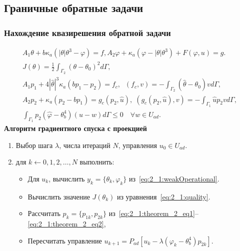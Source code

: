 \subsection{Граничные обратные задачи}
\begin{frame}
    \frametitle{Нахождение квазирешения обратной задачи}
    \begin{gather}
        A_1 \theta + b \kappa_a (| \theta | \theta^3 - \varphi ) =
        f, A_2 \varphi + \kappa_a (\varphi - |\theta|\theta^3) + F(\varphi, u) = g.
        \label{eq:2_1:weakOperational}\\
        J(\theta) = \frac{1}{2} \int_{\Gamma_2} (\theta - \theta_0)^2 d\Gamma,
        \label{eq:2_1:quality}\\
        A_1 p_1 + 4 |\hat{\theta}|^3 \kappa_a(b p_1 - p_2) = f_c,
        \;\; (f_c,v) = - \int_{\Gamma_2} (\hat{\theta} - \theta_0) v d\Gamma,
        \label{eq:2_1:theorem_2_eq1}\\
        A_2 p_2 + \kappa_a (p_2-b p_1) = g_c(p_2, \hat{u}),
        \;(g_c(p_2, \hat{u}), v) = -\int_{\Gamma_1} \hat{u} p_2 v d\Gamma,
        \label{eq:2_1:theorem_2_eq2}\\
        \int_{\Gamma_1} p_2 (\hat{\varphi} - \theta_b^4)(u-w) d\Gamma
        \leq 0 \quad \forall w \in U_{ad}. \label{eq:2_1:theorem_2_eq3}
    \end{gather}
    \textbf{Алгоритм градиентного спуска с проекцией}
    \begin{enumerate}
        \item Выбор шага $\lambda$, числа итераций $N$, управления $u_0 \in U_{ad}$.
        \item для $k \leftarrow 0,1,2, \ldots, N$ выполнить:
        \begin{itemize}
            \item Для $u_{k}$, вычислить $y_k = \{\theta_k, \varphi_k\}$ из~\eqref{eq:2_1:weakOperational}.
            \item Вычислить значение $J(\theta_k)$ из уравнения~\eqref{eq:2_1:quality}.
            \item Рассчитать $p_k=\{p_{1k},p_{2k}\}$
            из~\eqref{eq:2_1:theorem_2_eq1}--\eqref{eq:2_1:theorem_2_eq2},
            \item Пересчитать управление
            $u_{k+1} = P_{ad}\left[ u_k - \lambda (\varphi_k - \theta_b^4)p_{2k} \right]$.
        \end{itemize}
    \end{enumerate}
\end{frame}

